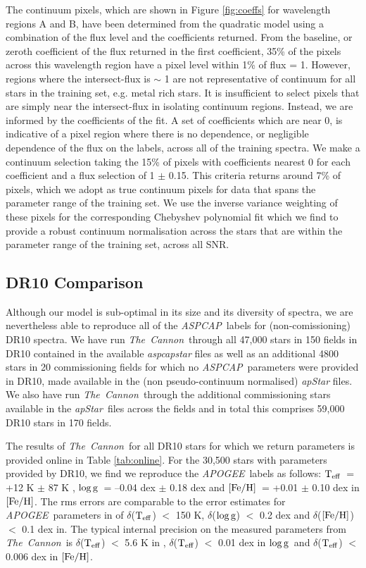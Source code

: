 \documentclass[12pt, preprint]{aastex}
\newcommand{\teff}{\mbox{$\rm T_{eff}$}}
\newcommand{\feh}{\mbox{$\rm [Fe/H]$}}
\newcommand{\logg}{\mbox{$\rm \log g$}}
\newcommand{\tc}{\textsl{The~Cannon}}
\newcommand{\apogee}{\textsl{APOGEE}}
\newcommand{\aspcap}{\textsl{ASPCAP}}
\newcommand{\apstar}{\textsl{apStar}}
\begin{document}
The continuum pixels, which are shown in Figure \ref{fig:coeffs} for wavelength regions A and B,  have been determined from the quadratic model using a combination of the flux level and the coefficients returned.  From the baseline, or zeroth coefficient of the flux returned in the first coefficient, 35\% of the pixels across this wavelength region have a pixel level within 1\% of flux = 1. However, regions where the intersect-flux is $\sim$ 1 are not representative of continuum for all stars in the training set, e.g. metal rich stars. It is insufficient to select pixels that are simply near the intersect-flux in isolating continuum regions. Instead, we are informed by the coefficients of the fit. A set of coefficients which are near 0, is indicative of a pixel region where there is no dependence, or negligible dependence of the flux on the labels, across all of the training spectra. We make a continuum selection taking the 15\% of pixels with coefficients nearest 0 for each coefficient and a flux selection of 1 $\pm$ 0.15. This criteria returns around  7\% of pixels, which we adopt as true continuum pixels for data that spans the parameter range of the training set. We use the inverse variance weighting of these pixels for the corresponding Chebyshev polynomial fit which we find to provide a robust continuum normalisation across the stars that are within the parameter range of the training set, across all SNR. 

\subsection{DR10 Comparison}

Although our model is sub-optimal in its size and its diversity of spectra, we are nevertheless able to reproduce all of the \aspcap\ labels for (non-comissioning) DR10 spectra. We have run \tc\ through all 47,000 stars in 150 fields in DR10 contained in the available \textit{aspcapstar} files as well as an additional 4800 stars in 20 commissioning fields for which no \aspcap\ parameters were provided in DR10, made available in the (non pseudo-continuum normalised) \textit{apStar} files. We also have run \tc\ through the additional commissioning stars available in the \apstar\ files across the fields and in total this comprises 59,000 DR10 stars in 170 fields. %

The results of \tc\ for all DR10 stars for which we return parameters is provided online in Table \ref{tab:online}. For the 30,500 stars with parameters provided by DR10, we find we reproduce the \apogee\ labels as follows: \teff\ = +12 K $\pm$ 87 K ,  \logg\ = --0.04 dex $\pm$  0.18 dex and \feh\ = +0.01 $\pm$ 0.10 dex in \feh. The rms errors are comparable to the error estimates for \apogee\ parameters in \citet{Meszaros2013} of $\delta$(\teff) $<$ 150 K, $\delta$(\logg) $<$  0.2 dex and $\delta$(\feh) $<$  0.1 dex in.  The typical internal precision on the measured parameters from \tc\ is  $\delta$(\teff) $<$ 5.6 K in ,  $\delta$(\teff) $<$ 0.01 dex in \logg\ and  $\delta$(\teff) $<$ 0.006 dex in \feh.
\end{document}
